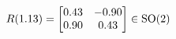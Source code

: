 \documentclass[preview]{standalone}
\begin{document}
\begin{align*}
\special{dvisvgm:raw <g id='unique000'>}R(1.13) = \begin{bmatrix} 0.43 & -0.90 \\ 0.90 & 0.43 \end{bmatrix} \in \text{SO}(2)\special{dvisvgm:raw </g>}
\end{align*}
\end{document}
